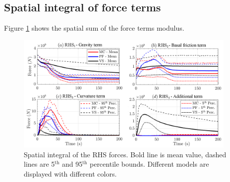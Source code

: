 \documentclass{article}
\begin{document}
\subsection{Spatial integral of force terms}
Figure \ref{fig:Colima-F-spatial} shows the spatial sum of the force terms modulus.
\begin{figure}[H]
        \centering
        \includegraphics[width=0.95\textwidth]{ancFigs/Colima/Forces_BAF.png}
        \caption{Spatial integral of the RHS forces. Bold line is mean value, dashed lines are 5$^{\mathrm{th}}$ and 95$^{\mathrm{th}}$ percentile bounds. Different models are displayed with different colors.}
        \label{fig:Colima-F-spatial}
\end{figure}
\end{document}

